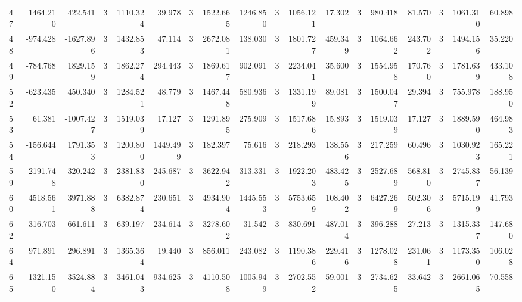 \begin{table}[ht]
\begin{tabular}{lrrrrrrrrrrrrrrrrr}
47 & 1464.210 & 422.541 & 3 & 1110.324 & 39.978 & 3 & 1522.665 & 1246.850 & 3 & 1056.121 & 17.302 & 3 & 980.418 & 81.570 & 3 & 1061.310 & 60.898 \\
48 & -974.428 & -1627.896 & 3 & 1432.853 & 47.114 & 3 & 2672.081 & 138.030 & 3 & 1801.727 & 459.349 & 3 & 1064.662 & 243.702 & 3 & 1494.156 & 35.220 \\
49 & -784.768 & 1829.159 & 3 & 1862.274 & 294.443 & 3 & 1869.617 & 902.091 & 3 & 2234.041 & 35.600 & 3 & 1554.958 & 170.760 & 3 & 1781.639 & 433.108 \\
52 & -623.435 & 450.340 & 3 & 1284.521 & 48.779 & 3 & 1467.448 & 580.936 & 3 & 1331.199 & 89.081 & 3 & 1500.047 & 29.394 & 3 & 755.978 & 188.950 \\
53 & 61.381 & -1007.427 & 3 & 1519.039 & 17.127 & 3 & 1291.895 & 275.909 & 3 & 1517.686 & 15.893 & 3 & 1519.039 & 17.127 & 3 & 1889.590 & 464.983 \\
54 & -156.644 & 1791.353 & 3 & 1200.800 & 1449.499 & 3 & 182.397 & 75.616 & 3 & 218.293 & 138.556 & 3 & 217.259 & 60.496 & 3 & 1030.923 & 165.221 \\
59 & -2191.748 & 320.242 & 3 & 2381.830 & 245.687 & 3 & 3622.942 & 313.331 & 3 & 1922.203 & 483.425 & 3 & 2527.689 & 568.810 & 3 & 2745.837 & 56.139 \\
60 & 4518.561 & 3971.888 & 3 & 6382.874 & 230.651 & 3 & 4934.904 & 1445.553 & 3 & 5753.659 & 108.402 & 3 & 6427.269 & 502.306 & 3 & 5715.199 & 41.793 \\
62 & -316.703 & -661.611 & 3 & 639.197 & 234.614 & 3 & 3278.602 & 31.542 & 3 & 830.691 & 487.014 & 3 & 396.288 & 27.213 & 3 & 1315.337 & 147.680 \\
64 & 971.891 & 296.891 & 3 & 1365.364 & 19.440 & 3 & 856.011 & 243.082 & 3 & 1190.386 & 229.416 & 3 & 1278.028 & 231.061 & 3 & 1173.350 & 106.028 \\
65 & 1321.150 & 3524.884 & 3 & 3461.043 & 934.625 & 3 & 4110.508 & 1005.949 & 3 & 2702.552 & 59.001 & 3 & 2734.625 & 33.642 & 3 & 2661.065 & 70.558 \\
\hline
\end{tabular}
\end{table}
